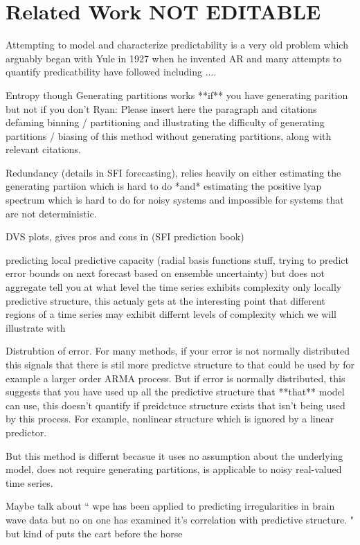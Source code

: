 \section{Related Work {\color{red} NOT EDITABLE}}\label{sec:related}

Attempting to model and characterize predictability is a very old problem which arguably began with Yule in 1927 when he invented AR and many attempts to quantify predicatbility have followed including ....

Entropy though Generating partitions 
works **if** you have generating parition but not if you don't
{\color{blue} Ryan: Please insert here the paragraph and citations defaming binning / partitioning and illustrating the difficulty of generating partitions / biasing of this method without generating partitions, along with relevant citations. }


Redundancy (details in SFI forecasting), relies heavily on either estimating the generating partiion which is hard to do *and* estimating the positive lyap spectrum which is hard to do for noisy systems and impossible for systems that are not deterministic. 

DVS plots, gives pros and cons in (SFI prediction book)

predicting local predictive capacity (radial basis functions stuff, trying to predict error bounds on next forecast based on ensemble uncertainty) but does not aggregate tell you at what level the time series exhibits complexity only locally predictive structure, this actualy gets at the interesting point that different regions of a time series may exhibit differnt levels of complexity which we will illustrate with \svd

Distrubtion of error. For many methods, if your error is not normally distributed this signals that there is stil more predictve structure to that could be used by for example a larger order ARMA process. But if error is normally distributed, this suggests that you have used up all the predictive structure that **that** model can use, this doesn't quantify if preidctuce structure exists that isn't being used by this process. For example, nonlinear structure which is ignored by a linear predictor. 


But this method is differnt becasue it uses no assumption about the underlying model, does not require generating partitions, is applicable to noisy real-valued time series. 


Maybe talk about ``
wpe has been applied to predicting irregularities in brain wave data but no on one has examined it's correlation with predictive structure. "
but kind of puts the cart before the horse


